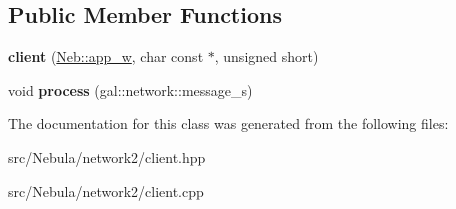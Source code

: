 \subsection*{\-Public \-Member \-Functions}
\begin{DoxyCompactItemize}
\item 
\hypertarget{classNeb_1_1network_1_1client_a84322d875326ae66e268c2c7b41d0829}{{\bfseries client} (\hyperlink{classNeb_1_1weak__ptr}{\-Neb\-::app\-\_\-w}, char const $\ast$, unsigned short)}\label{classNeb_1_1network_1_1client_a84322d875326ae66e268c2c7b41d0829}

\item 
\hypertarget{classNeb_1_1network_1_1client_ae065e3b673527bdb5686adf8196386dc}{void {\bfseries process} (gal\-::network\-::message\-\_\-s)}\label{classNeb_1_1network_1_1client_ae065e3b673527bdb5686adf8196386dc}

\end{DoxyCompactItemize}


\-The documentation for this class was generated from the following files\-:\begin{DoxyCompactItemize}
\item 
src/\-Nebula/network2/client.\-hpp\item 
src/\-Nebula/network2/client.\-cpp\end{DoxyCompactItemize}
